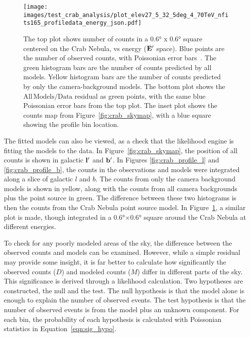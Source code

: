   \begin{figure}[p]
    \centering
    \texttt{[image: images/test\_crab\_analysis/plot\_elev27\_5\_32\_5deg\_4\_70TeV\_nfits165\_profiledata\_energy\_json.pdf]}
    \caption[Crab Nebula Profile in Energy]
    {
      The top plot shows number of counts in a \ang{0.6} x \ang{0.6} square centered on the Crab Nebula, vs energy ($\mathbf{E'}$ space).
      Blue points are the number of observed counts, with Poissonian error bars~\cite{poissonfrequentistinterval}.
      The green histogram bars are the number of counts predicted by all models.
      Yellow histogram bars are the number of counts predicted by only the camera-background models.
      The bottom plot shows the $\mathrm{All\,Models}/\mathrm{Data}$ residual as green points, with the same blue Poissonian error bars from the top plot.
      The inset plot shows the counts map from Figure~\ref{fig:crab_skymap}, with a blue square showing the profile bin location.
    }
    \label{fig:crab_profile_energy}
  \end{figure}
    
  The fitted models can also be viewed, as a check that the likelihood engine is fitting the models to the data.
  In Figure~\ref{fig:crab_skymap}, the position of all counts is shown in galactic $\mathbf{l'}$ and $\mathbf{b'}$.
  In Figures \ref{fig:crab_profile_l} and \ref{fig:crab_profile_b}, the counts in the observations and models were integrated along a slice of galactic $l$ and $b$.
  The counts from only the camera background models is shown in yellow, along with the counts from all camera backgrounds plus the point source in green.
  The difference between these two histograms is then the counts from the Crab Nebula point source model.
  In Figure~\ref{fig:crab_profile_energy}, a similar plot is made, though integrated in a \ang{0.6}$\times$\ang{0.6} square around the Crab Nebula at different energies.
  
  To check for any poorly modeled areas of the sky, the difference between the observed counts and models can be examined.
  However, while a simple residual may provide some insight, it is far better to calculate how significantly the observed counts ($D$) and modeled counts ($M$) differ in different parts of the sky.
  This significance is derived through a likelihood calculation.
  Two hypotheses are constructed, the null and the test.
  The null hypothesis is that the model alone is enough to explain the number of observed events.
  The test hypothesis is that the number of observed events is from the model plus an unknown component.
  For each bin, the probability of each hypothesis is calculated with Poissonian statistics in Equation~\ref{eqn:sig_hypo}.

